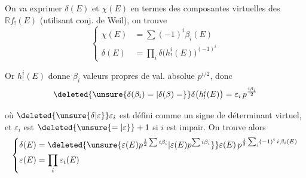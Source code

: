 
On va exprimer $\delta(E)$ et $\chi(E)$ en termes des  composantes virtuelles des $\mathbb R f_!(E)$ (utilisant conj. de Weil), on trouve
\[
\left\{\begin{aligned}
\chi(E)&=\sum(-1)^i\beta_i(E)\\
\delta(E)&=\prod_i\delta\bigl(h^i_!(E)\bigr)^{(-1)^i}
\end{aligned}\right.
\]

Or $h^i_!(E)$ donne $\beta_i$ valeurs propres de val. absolue $p^{i/2}$, donc
\[
\deleted{\unsure{\delta(\beta_i)=|\delta(\beta)=}}\delta\bigl(h^i_!(E)\bigr)=\varepsilon_i\,p^{\frac{i\beta_i}{2}}
\]

où $\deleted{\unsure{\delta|\varepsilon}}\varepsilon_i$ est défini comme un signe de déterminant virtuel, et $\varepsilon_i$ est $\deleted{\unsure{=|\varepsilon}}+1$ si $i$ est impair. On trouve alors
\[
\left\{\begin{aligned}
\delta(E)&=\deleted{\unsure{\varepsilon(E)p^{\frac12\sum i\beta_i}|\varepsilon(E)p^{\sum i\beta_i}}}\varepsilon(E)\,p^{\frac12\sum_i(-1)^i\,i\,\beta_i(E)}\\
\varepsilon(E)&=\prod_i\varepsilon_i(E)
\end{aligned}\right.
\]
